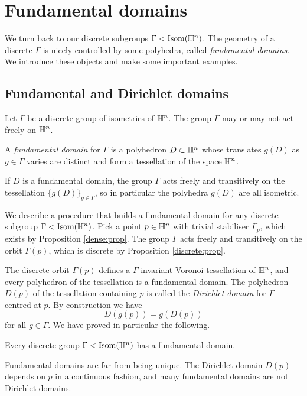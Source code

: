 \section{Fundamental domains}
We turn back to our discrete subgroups $\Gamma < {\rm Isom}(\mathbb{H}^n)$. The geometry of a discrete $\Gamma$ is nicely controlled by some polyhedra, called \emph{fundamental domains}.
We introduce these objects and make some important examples.

\subsection{Fundamental and Dirichlet domains}
Let $\Gamma$ be a discrete group of isometries of $\mathbb{H}^n$. The group $\Gamma$ may or may not act freely on $\mathbb{H}^n$.  
\begin{defn}
A \emph{fundamental domain} for $\Gamma$ is a polyhedron $D \subset\mathbb{H}^n$ whose translates $g(D)$ as $g\in \Gamma$ varies are distinct and form a tessellation of the space $\mathbb{H}^n$. 
\end{defn}
If $D$ is a fundamental domain, the group $\Gamma$ acts freely and transitively on the tessellation $\big\{g(D)\big\}_{g \in \Gamma}$, so in particular the polyhedra $g(D)$ are all isometric. 

We describe a procedure that builds a fundamental domain for any discrete subgroup $\Gamma < {\rm Isom}(\mathbb{H}^n)$. Pick  a point $p\in \mathbb{H}^n$ 
with trivial stabiliser $\Gamma_p$, which exists by Proposition \ref{dense:prop}. The group $\Gamma$ acts freely and transitively on the orbit $\Gamma(p)$, which is discrete by Proposition \ref{discrete:prop}.

The discrete orbit $\Gamma(p)$ defines a $\Gamma$-invariant Voronoi tessellation of $\mathbb{H}^n$, and every polyhedron of the tessellation is a fundamental domain. The polyhedron $D(p)$ of the tessellation containing $p$ is called the \emph{Dirichlet domain} for $\Gamma$ centred at $p$. By construction we have 
$$D(g(p)) = g(D(p))$$
for all $g\in \Gamma$. We have proved in particular the following.

\begin{prop}
Every discrete group $\Gamma < {\rm Isom}(\mathbb{H}^n)$ has a fundamental domain.
\end{prop}

Fundamental domains are far from being unique. The Dirichlet domain $D(p)$ depends on $p$ in a continuous fashion, and many fundamental domains are not Dirichlet domains.

